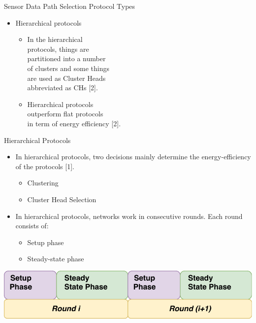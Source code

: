 \documentclass{beamer}
\begin{document}
\begin{frame}[t]{Sensor Data Path Selection Protocol Types}
\begin{itemize}
\item Hierarchical protocols
\begin{itemize}
\justifying
\footnotesize
\item In the hierarchical \\ protocols, things are \\ partitioned into a number \\ of clusters and some things \\ are used as Cluster Heads \\ abbreviated as CHs [2].

\item Hierarchical protocols \\ outperform flat protocols \\ in term of energy efficiency [2].

\end{itemize}
\end{itemize}
\end{frame}


\begin{frame}[t]{Hierarchical Protocols} %
\small
\begin{itemize}
\justifying
\item In hierarchical protocols, two decisions mainly determine the energy-efficiency of the protocols [1].
	
\begin{itemize}
\item Clustering
\item Cluster Head Selection
\end{itemize}
	
\item In hierarchical protocols, networks work in consecutive rounds. Each round consists of: 
\begin{itemize}
\item Setup phase
\item Steady-state phase
\end{itemize}

\end{itemize}

\begin{center}
\includegraphics[scale=0.69]{figure/Phase}
\end{center}

\end{frame}
\end{document}
